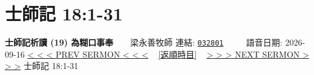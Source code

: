 \documentclass{book}
\begin{document}
\section{士師記 18:1-31}
\label{sec:032801}
\textbf{士師記析讀 (19) 為糊口事奉}~~~~梁永善牧師
\newline
\newline
連結: \href{http://www.church.com.hk/acms/content.asp?site=cdc\&op=show\&type=product\&code=032801\&layout=sermon}{\texttt{032801}} ~~~~ 語音日期: 2026-09-16
\newline
\newline
\hyperref[sec:032818]{\small{< < < PREV SERMON < < <}}
~
\hyperref[sec:index_chronic]{\small{[返順時目]}}
~
\hyperref[sec:032802]{\small{> > > NEXT SERMON > > >}}
\newline
\newline
士師記 18:1-31
\newline
\end{document}
